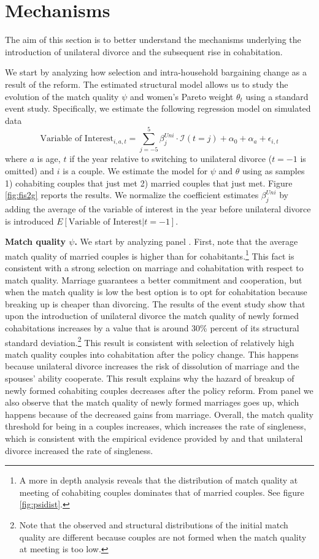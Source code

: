 \documentclass[12pt]{article}
\numberwithin{table}{section}
\begin{document}
\section{Mechanisms}
The aim of this section is to better understand the mechanisms underlying the introduction of unilateral divorce and the subsequent rise in cohabitation.

 We start by analyzing how selection and intra-household bargaining change as a result of the reform. The estimated structural model allows us to study the evolution of the match quality $\psi$ and women's Pareto weight $\theta_t$ using a standard event study. Specifically, we estimate the following regression model on simulated data
\begin{equation}\label{eq:ev_stud}
\text{Variable of Interest}_{i,a,t}=\sum_{j=-5}^{5}\beta^{Uni}_j\cdot\mathcal{I}(t=j)+\alpha_{0}+\alpha_{a}+\epsilon_{i,t}
\end{equation}
where $a$ is age, $t$ if the year relative to switching to unilateral divorce ($t=-1$ is omitted) and $i$ is a couple. We estimate the model for $\psi$ and $\theta$ using as samples 1) cohabiting couples that just met 2) married couples that just met.
Figure \ref{fig:fis2g} reports the results. We normalize the coefficient estimates $\beta^{Uni}_j$ by adding the average of the variable of interest in the year before unilateral divorce is introduced $E[\text{Variable of Interest}|t=-1]$. 

\textbf{Match quality $\psi$.} We start by analyzing panel . First, note that the average match quality of married couples is higher than for cohabitants.\footnote{A more in depth analysis reveals that the distribution of match quality at meeting of cohabiting couples dominates that of married couples. See figure \ref{fig:psidist}.} This fact is consistent with a strong selection on marriage and cohabitation with respect to match quality. Marriage guarantees a better commitment and cooperation, but when the match quality is low the best option is to opt for cohabitation because breaking up is cheaper than divorcing. The results of the event study show that upon the introduction of unilateral divorce the match quality of newly formed cohabitations increases by a value that is around 30\% percent of its structural standard deviation.\footnote{Note that the observed and structural distributions of the initial match quality are different because couples are not formed when the match quality at meeting is too low.} This result is consistent with selection of relatively high match quality couples into cohabitation after the policy change. This happens because unilateral divorce increases the risk of dissolution of marriage and the spouses' ability cooperate. This result explains why the hazard of breakup of newly formed cohabiting couples decreases after the policy reform. From panel  we also observe that the match quality of newly formed marriages goes up, which happens because of the decreased gains from marriage. Overall, the match quality threshold for being in a couples increases, which increases the rate of singleness, which is consistent with the empirical evidence provided by \cite{rasul2003,rasul2006} and \cite{reynoso2019} that unilateral divorce increased the rate of singleness. 
\end{document}
